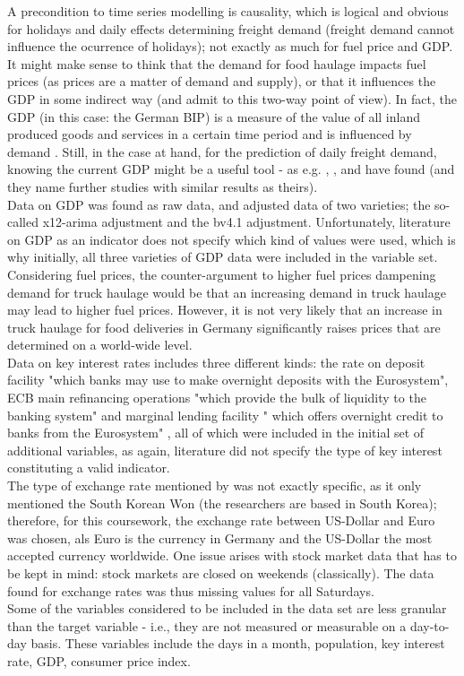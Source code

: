 \documentclass[a4paper, 11pt]{article}
\begin{document}
A precondition to time series modelling is causality, which is logical and obvious for holidays and daily effects determining freight demand (freight demand cannot influence the ocurrence of holidays); not exactly as much for fuel price and GDP.\\
It might make sense to think that the demand for food haulage impacts fuel prices (as prices are a matter of demand and supply), or that it influences the GDP in some indirect way (and \cite{JONG.2004} admit to this two-way point of view). 
In fact, the GDP (in this case: the German BIP) is a measure of the value of all inland produced goods and services in a certain time period \cite{StatistischesBundesamt.} and is influenced by demand \cite{Bundesregierung.}. Still, in the case at hand, for the prediction of daily freight demand, knowing the current GDP might be a useful tool - as e.g. \cite{Fite.2002}, \cite{Saidi.2017}, \cite{Guo.2013} and \cite{Intihar.2017} have found (and they name further studies with similar results as theirs). \\
Data on GDP was found as raw data, and adjusted data of two varieties; the so-called x12-arima adjustment and the bv4.1 adjustment. Unfortunately, literature on GDP as an indicator does not specify which kind of values were used, which is why initially, all three varieties of GDP data were included in the variable set.\\
Considering fuel prices, the counter-argument to higher fuel prices dampening demand for truck haulage would be that an increasing demand in truck haulage may lead to higher fuel prices. However, it is not very likely that an increase in truck haulage for food deliveries in Germany significantly raises prices that are determined on a world-wide level. \\

Data on key interest rates includes three different kinds: the rate on deposit facility "which banks may use to make overnight deposits with the Eurosystem", ECB main refinancing operations "which provide the bulk of liquidity to the banking system" and marginal lending facility " which offers overnight credit to banks from the Eurosystem" \citep{Bank.}, all of which were included in the initial set of additional variables, as again, literature did not specify the type of key interest constituting a valid indicator.\\
The type of exchange rate mentioned by \cite{Kim.2011} was not exactly specific, as it only mentioned the South Korean Won (the researchers are based in South Korea); therefore, for this coursework, the exchange rate between US-Dollar and Euro was chosen, als Euro is the currency in Germany and the US-Dollar the most accepted currency worldwide. One issue arises with stock market data that has to be kept in mind: stock markets are closed on weekends (classically). The data found for exchange rates was thus missing values for all Saturdays.\\
Some of the variables considered to be included in the data set are less granular than the target variable - i.e., they are not measured or measurable on a day-to-day basis. These variables include the days in a month, population, key interest rate, GDP, consumer price index.\\
\end{document}
